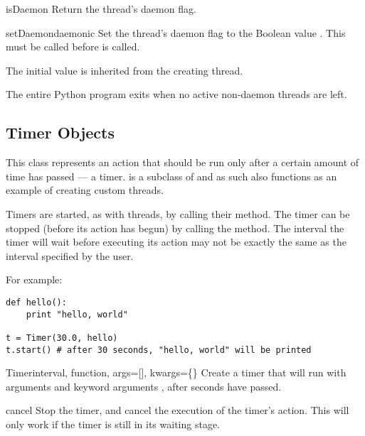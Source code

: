 \begin{methoddesc}{isDaemon}{}
Return the thread's daemon flag.
\end{methoddesc}

\begin{methoddesc}{setDaemon}{daemonic}
Set the thread's daemon flag to the Boolean value .
This must be called before  is called.

The initial value is inherited from the creating thread.

The entire Python program exits when no active non-daemon
threads are left.
\end{methoddesc}


\subsection{Timer Objects \label{timer-objects}}

This class represents an action that should be run only after a
certain amount of time has passed --- a timer.   is a
subclass of  and as such also functions as an example of
creating custom threads.

Timers are started, as with threads, by calling their 
method.  The timer can be stopped (before its action has begun) by
calling the  method.  The interval the timer will
wait before executing its action may not be exactly the same as the
interval specified by the user.

For example:
\begin{verbatim}
def hello():
    print "hello, world"

t = Timer(30.0, hello)
t.start() # after 30 seconds, "hello, world" will be printed
\end{verbatim}

\begin{classdesc}{Timer}{interval, function, args=[], kwargs=\{\}}
Create a timer that will run  with arguments  and 
keyword arguments , after  seconds have passed.
\end{classdesc}

\begin{methoddesc}{cancel}{}
Stop the timer, and cancel the execution of the timer's action.  This
will only work if the timer is still in its waiting stage.
\end{methoddesc}
